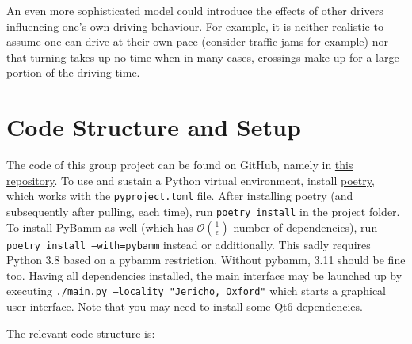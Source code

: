 \documentclass{prettytex/ox/mmsc-special-topic}
\begin{document}
  An even more sophisticated model could introduce the effects of other drivers influencing one's own driving behaviour.
  For example, it is neither realistic to assume one can drive at their own pace (consider traffic jams for example) nor that turning takes up no time when in many cases, crossings make up for a large portion of the driving time.

  \pagebreak
  \printbibliography

  \pagebreak
  \appendix

  \section{Code Structure and Setup}
  \label{sec:code}
  The code of this group project can be found on GitHub, namely in \href{https://github.com/MrP01/BatteryModelling}{this repository}.
  To use and sustain a Python virtual environment, install
  \href{https://python-poetry.org/}{poetry}, which works with the
  \texttt{pyproject.toml} file. After installing poetry (and subsequently
  after pulling, each time), run
  \texttt{poetry install}
  in the project folder. To install PyBamm as well (which has $\mathcal{O}(\frac{1}{\epsilon})$ number of dependencies), run
  \texttt{poetry install --with=pybamm}
  instead or additionally. This sadly requires Python 3.8 based on a
  pybamm restriction. Without pybamm, 3.11 should be fine too.
  Having all dependencies installed, the main interface may be launched up
  by executing \texttt{./main.py --locality "Jericho, Oxford"}
  which starts a graphical user interface. Note that you may need to install some Qt6 dependencies.

  The relevant code structure is:
\end{document}
